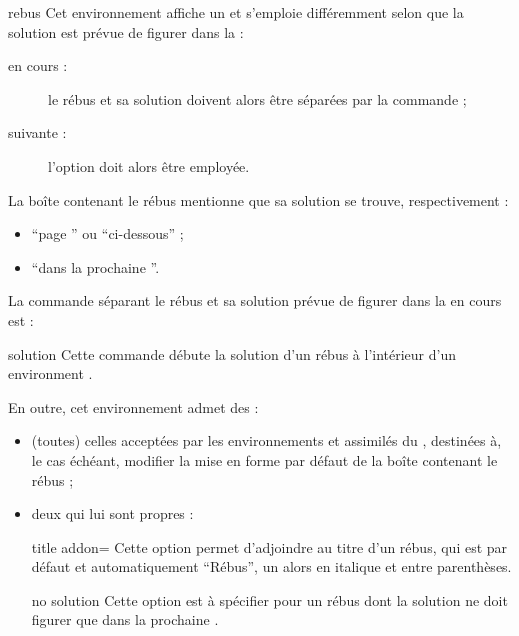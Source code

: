 \documentclass{letgut}
\begin{document}
\begin{docEnvironment}[doclang/environment content=rébus]{rebus}{}
  Cet environnement affiche un  et s'emploie différemment selon que
  la solution est prévue de figurer dans la  :
  \begin{description}
  \item[en cours :] le rébus et sa solution doivent alors être séparées par
    la commande  ;
  \item[suivante :] l'option  doit alors être employée.
  \end{description}
  La boîte contenant le rébus mentionne que sa solution se trouve,
  respectivement :
  \begin{itemize}
  \item \enquote{page } ou \enquote{ci-dessous} ;
  \item \enquote{dans la prochaine }.
  \end{itemize}

  La commande séparant le rébus et sa solution prévue de figurer dans la
   en cours est :
  \begin{docCommand}{solution}{}
    Cette commande débute la solution d'un rébus à l'intérieur d'un environment
    .
  \end{docCommand}

  En outre, cet environnement admet des  :
  \begin{itemize}
  \item (toutes) celles acceptées par les environnements  et
    assimilés du , destinées à, le cas échéant, modifier la
    mise en forme par défaut de la boîte contenant le rébus ;
  \item deux qui lui sont propres :
    \begin{docKey}{title addon}{=}{\valinitdef}
      Cette option permet d'adjoindre au titre d'un rébus, qui est par défaut et
      automatiquement \enquote{Rébus}, un  alors en italique et
      entre parenthèses.
    \end{docKey}
    \begin{docKey}{no solution}{}{}
      Cette option est à spécifier pour un rébus dont la solution ne doit figurer
      que dans la prochaine .
    \end{docKey}
  \end{itemize}
\end{docEnvironment}
\end{document}
